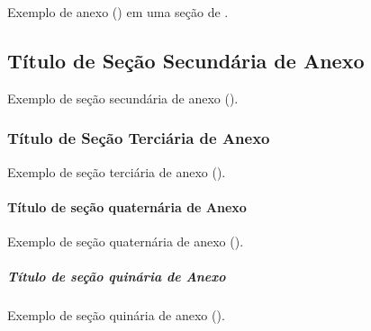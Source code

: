 \begin{Annex}
Exemplo de anexo () em uma seção de .

\subsection{Título de Seção Secundária de Anexo}%
\label{ssect:anx-b2}

Exemplo de seção secundária de anexo ().

\subsubsection{Título de Seção Terciária de Anexo}%
\label{sssect:anx-b3}

Exemplo de seção terciária de anexo ().

\paragraph{Título de seção quaternária de Anexo}%
\label{prgh:anx-b4}

Exemplo de seção quaternária de anexo ().

\subparagraph{Título de seção quinária de Anexo}%
\label{sprgh:anx-b5}

Exemplo de seção quinária de anexo ().

\end{Annex}

\printindex%
